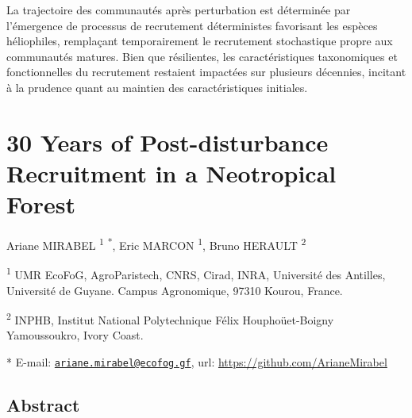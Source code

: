 \documentclass[
  11pt,
  french,
  A4paper,
  extrafontsizes,onecolumn,openright
  ]{memoir}
\begin{document}
La trajectoire des communautés après perturbation est déterminée par
l'émergence de processus de recrutement déterministes favorisant les
espèces héliophiles, remplaçant temporairement le recrutement
stochastique propre aux communautés matures. Bien que résilientes, les
caractéristiques taxonomiques et fonctionnelles du recrutement restaient
impactées sur plusieurs décennies, incitant à la prudence quant au
maintien des caractéristiques initiales.

\newpage

\section{30 Years of Post-disturbance Recruitment in a Neotropical
Forest}\label{years-of-post-disturbance-recruitment-in-a-neotropical-forest}

Ariane MIRABEL \textsuperscript{1} \textsuperscript{*}, Eric MARCON
\textsuperscript{1}, Bruno HERAULT \textsuperscript{2} \newline

\textsuperscript{1} UMR EcoFoG, AgroParistech, CNRS, Cirad, INRA,
Université des Antilles, Université de Guyane. Campus Agronomique, 97310
Kourou, France.

\textsuperscript{2} INPHB, Institut National Polytechnique Félix
Houphoüet-Boigny Yamoussoukro, Ivory Coast. \newline

* E-mail:
\href{mailto:ariane.mirabel@ecofog.gf}{\nolinkurl{ariane.mirabel@ecofog.gf}},
url: \url{https://github.com/ArianeMirabel}

\subsection{Abstract}\label{abstract-2}
\end{document}
